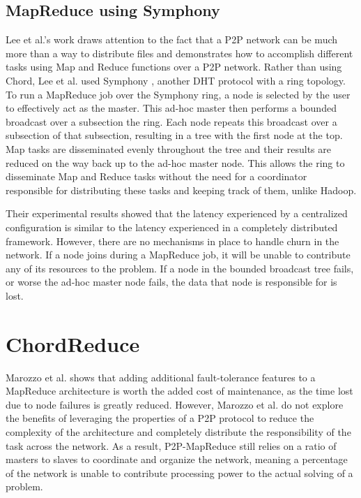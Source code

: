 \subsection{MapReduce using Symphony}

Lee et al.'s work \cite{leemap} draws attention to the fact that a P2P network can be much more than a way to distribute files and demonstrates how to accomplish different tasks using Map and Reduce functions over a P2P network.  Rather than using Chord, Lee et al. used Symphony \cite{symphony}, another DHT protocol with a ring topology.  To run a MapReduce job over the Symphony ring, a node is selected by the user to effectively act as the master.  This ad-hoc master then performs a bounded broadcast over a subsection the ring.  Each node repeats this broadcast over a subsection of that subsection, resulting in a tree with the first node at the top.  Map tasks are disseminated evenly throughout the tree and their results are reduced on the way back up to the ad-hoc master node.  This allows the ring to disseminate Map and Reduce tasks without the need for a coordinator responsible for distributing these tasks and keeping track of them, unlike Hadoop.

Their experimental results showed that the latency experienced by a centralized configuration is similar to the latency experienced in a completely distributed framework.  However, there are no mechanisms in place to handle churn in the network.  If a node joins during a MapReduce job, it will be unable to contribute any of its resources to the problem. If a node in the bounded broadcast tree fails, or worse the ad-hoc master node fails, the data that node is responsible for is lost. 


\section{ChordReduce}
Marozzo et al. \cite{marozzo2012p2p} shows that adding additional fault-tolerance features to a MapReduce architecture is worth the added cost of maintenance, as the time lost due to node failures is greatly reduced.  However, Marozzo et al. do not explore the benefits of leveraging the properties of a P2P protocol to reduce the complexity of the architecture and completely distribute the responsibility of the task across the network.  As a result, P2P-MapReduce still relies on a ratio of masters to slaves to coordinate and organize the network, meaning a percentage of the network is unable to contribute processing power to the actual solving of a problem.   

